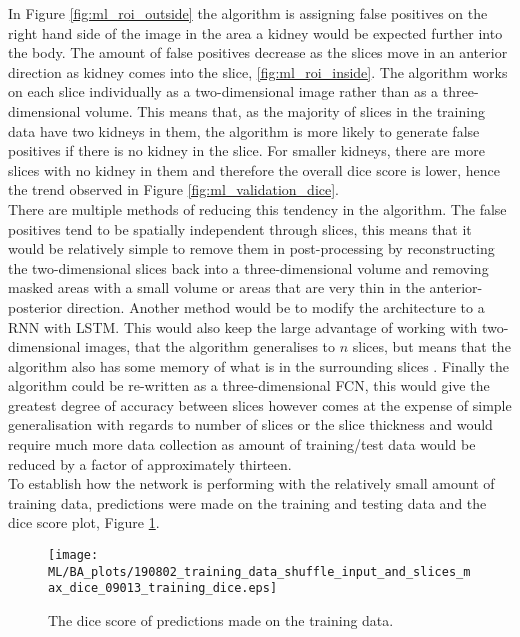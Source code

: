 In Figure \ref{fig:ml_roi_outside} the algorithm is assigning false positives on the right hand side of the image in the area a kidney would be expected further into the body. The amount of false positives decrease as the slices move in an anterior direction as kidney comes into the slice, \ref{fig:ml_roi_inside}. The algorithm works on each slice individually as a two-dimensional image rather than as a three-dimensional volume. This means that, as the majority of slices in the training data have two kidneys in them, the algorithm is more likely to generate false positives if there is no kidney in the slice. For smaller kidneys, there are more slices with no kidney in them and therefore the overall dice score is lower, hence the trend observed in Figure \ref{fig:ml_validation_dice}.\\

There are multiple methods of reducing this tendency in the algorithm. The false positives tend to be spatially independent through slices, this means that it would be relatively simple to remove them in post-processing by reconstructing the two-dimensional slices back into a three-dimensional volume and removing masked areas with a small volume or areas that are very thin in the anterior-posterior direction. Another method would be to modify the architecture to a \ac{RNN} with \ac{LSTM}. This would also keep the large advantage of working with two-dimensional images, that the algorithm generalises to $n$ slices, but means that the algorithm also has some memory of what is in the surrounding slices \cite{chen_combining_2016, stollenga_parallel_2015}. Finally the algorithm could be re-written as a three-dimensional \ac{FCN}, this would give the greatest degree of accuracy between slices however comes at the expense of simple generalisation with regards to number of slices or the slice thickness and would require much more data collection as amount of training/test data would be reduced by a factor of approximately thirteen.\\

To establish how the network is performing with the relatively small amount of training data, predictions were made on the training and testing data and the dice score plot, Figure \ref{fig:ml_training_dice}.

\begin{figure}[H]
	\centering
	\texttt{[image: ML/BA\_plots/190802\_training\_data\_shuffle\_input\_and\_slices\_max\_dice\_09013\_training\_dice.eps]}
	\caption{The dice score of predictions made on the training data.}
	\label{fig:ml_training_dice}
\end{figure}

